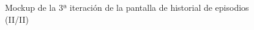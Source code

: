 \begin{figure}[H]
    \centering
    \begin{minipage}{.6\textwidth}
        \centering
        \caption[Mockup de la 3ª iteración de la pantalla de historial de episodios (II/II)]{Mockup de la 3ª iteración de la pantalla de historial de episodios (II/II)}
        \label{c4:fig:v3:android:15EpisodesHistory2}
    \end{minipage}
\end{figure}

